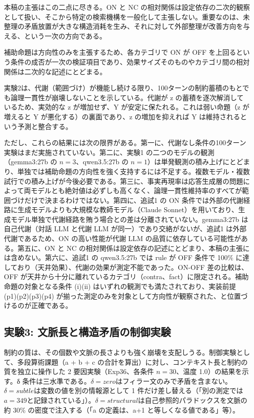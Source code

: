 \documentclass[12pt,a4paper]{article}
\begin{document}
本稿の主張はこの二点に尽きる。ON と NC の相対関係は設定依存の二次的観察として扱い、そこから特定の検索機構を一般化して主張しない。重要なのは、未整理の矛盾放置が大きな構造消耗を生み、それに対して外部整理が改善方向を与える、という一次の方向である。

補助命題は方向性のみを主張するため、各カテゴリで ON が OFF を上回るという条件の成否が一次の検証項目であり、効果サイズそのものやカテゴリ間の相対関係は二次的な記述にとどまる。

実験2は、代謝（範囲づけ）が機能し続ける限り、100ターンの制約蓄積のもとでも論理一貫性が崩壊しないことを示している。代謝が z の蓄積を逐次解消しているため、実効的な z が増加せず、Y が安定に保たれる。これは弱い命題（z が増えると Y が悪化する）の裏面であり、z の増加を抑えれば Y は維持されるという予測と整合する。

ただし、これらの結果には次の限界がある。第一に、代謝なし条件の100ターン実験はまだ実施されていない。第二に、実験1 の二つのモデルの観測（gemma3:27b の \(n=3\)、qwen3.5:27b の \(n=1\)）は単発観測の積み上げにとどまり、単独では補助命題の方向性を強く支持するには不足する。複数モデル・複数試行での積み上げが今後必要である。第三に、事実再現率は応答生成層の問題によって両モデルとも絶対値は必ずしも高くなく、論理一貫性維持率のすべてが範囲づけだけで決まるわけではない。第四に、追試1 の ON 条件では外部の代謝経路に生成モデルよりも大規模な教師モデル（Claude Sonnet）を用いており、生成モデル単独で代謝経路を賄う場合との差は分離されていない。gemma3:27b は自己代謝（対話 LLM と代謝 LLM が同一）であり交絡がないが、追試1 は外部代謝であるため、ON の高い性能が代謝 LLM の品質に依存している可能性がある。第五に、ON と NC の相対関係は設定依存の記述にとどまり、本稿の主張には含めない。第六に、追試1 の qwen3.5:27b では rule が OFF 条件で 100\% に達しており（天井効果）、代謝の効果が測定不能であった。ON-OFF 差の比較は、OFF が天井から十分に離れているカテゴリ（contra、fact）に限定される。補助命題の対象となる条件 (i)(ii) はいずれの観測でも満たされており、実装前提 (p1)(p2)(p3)(p4) が揃った測定のみを対象として方向性が観察された、と位置づけるのが正確である。

\subsection{実験3: 文脈長と構造矛盾の制御実験}\label{ux5b9fux9a133-ux6587ux8108ux9577ux3068ux69cbux9020ux77dbux76feux306eux5236ux5fa1ux5b9fux9a13}

制約の質は、その個数や文脈の長さよりも強く崩壊を支配しうる。制御実験として、多段算術課題（a + b + c の合計を算出）に対し、コンテキスト長と制約の質を独立に操作した 2 要因実験（Exp36、各条件 \(n=30\)、温度 1.0）の結果を示す。δ 条件は三水準である。\(\delta=zero\)はフィラー文のみで矛盾を含まない。\(\delta=subtle\)は変数の値を別の情報源として 1 件だけ差し替える（「別の測定では \(a=349\)と記録されている」）。\(\delta=structural\)は自己参照的パラドックスを文脈の約 30\% の密度で注入する（「a の定義は、a+1 と等しくなる値である」等）。
\end{document}
